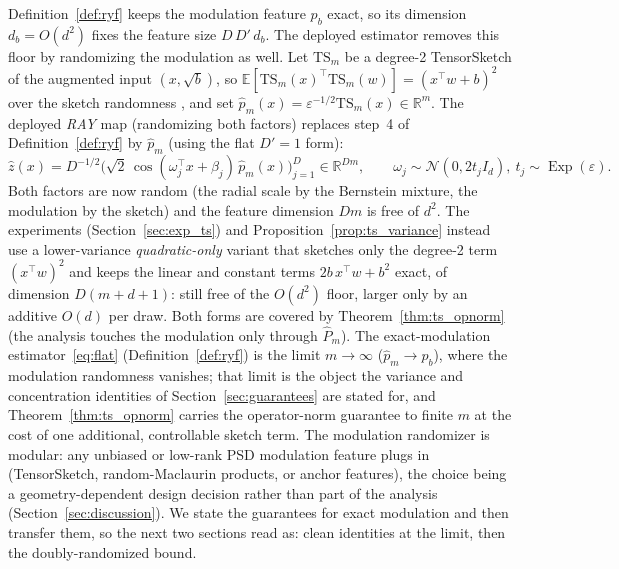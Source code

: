 \documentclass{article}
\DeclareMathOperator{\Exp}{Exp}
\begin{document}
Definition~\ref{def:ryf} keeps the modulation feature $p_b$ exact, so its dimension $d_b=O(d^2)$ fixes the feature size $D\,D'\,d_b$. The deployed estimator removes this floor by randomizing the modulation as well. Let $\mathrm{TS}_m$ be a degree-2 TensorSketch of the augmented input $(x,\sqrt b)$, so $\mathbb{E}[\mathrm{TS}_m(x)^\top\mathrm{TS}_m(w)]=(x^\top w+b)^2$ over the sketch randomness \citep{pham2013fast,avron2014subspace}, and set $\widehat p_m(x)=\varepsilon^{-1/2}\mathrm{TS}_m(x)\in\mathbb{R}^m$. The deployed \emph{RAY} map (randomizing both factors) replaces step~4 of Definition~\ref{def:ryf} by $\widehat p_m$ (using the flat $D'=1$ form):
\begin{equation}\label{eq:doubly}
\widehat z(x)=D^{-1/2}\bigl(\sqrt2\,\cos(\omega_j^\top x+\beta_j)\,\widehat p_m(x)\bigr)_{j=1}^D\in\mathbb{R}^{Dm},\qquad \omega_j\sim\mathcal{N}(0,2t_jI_d),\ t_j\sim\Exp(\varepsilon).
\end{equation}
Both factors are now random (the radial scale by the Bernstein mixture, the modulation by the sketch) and the feature dimension $Dm$ is free of $d^2$. The experiments (Section~\ref{sec:exp_ts}) and Proposition~\ref{prop:ts_variance} instead use a lower-variance \emph{quadratic-only} variant that sketches only the degree-2 term $(x^\top w)^2$ and keeps the linear and constant terms $2b\,x^\top w+b^2$ exact, of dimension $D(m{+}d{+}1)$: still free of the $O(d^2)$ floor, larger only by an additive $O(d)$ per draw. Both forms are covered by Theorem~\ref{thm:ts_opnorm} (the analysis touches the modulation only through $\widehat P_m$). The exact-modulation estimator~\eqref{eq:flat} (Definition~\ref{def:ryf}) is the limit $m\to\infty$ ($\widehat p_m\to p_b$), where the modulation randomness vanishes; that limit is the object the variance and concentration identities of Section~\ref{sec:guarantees} are stated for, and Theorem~\ref{thm:ts_opnorm} carries the operator-norm guarantee to finite $m$ at the cost of one additional, controllable sketch term. The modulation randomizer is modular: any unbiased or low-rank PSD modulation feature plugs in (TensorSketch, random-Maclaurin products, or anchor features), the choice being a geometry-dependent design decision rather than part of the analysis (Section~\ref{sec:discussion}). We state the guarantees for exact modulation and then transfer them, so the next two sections read as: clean identities at the limit, then the doubly-randomized bound.
\end{document}
